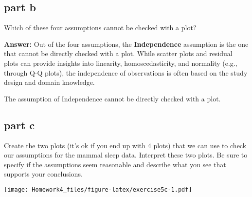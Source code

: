 \documentclass[
]{article}
\newenvironment{Shaded}{\begin{snugshade}}{\end{snugshade}}
\newcommand{\AttributeTok}[1]{\textcolor[rgb]{0.13,0.29,0.53}{#1}}
\newcommand{\DecValTok}[1]{\textcolor[rgb]{0.00,0.00,0.81}{#1}}
\newcommand{\FunctionTok}[1]{\textcolor[rgb]{0.13,0.29,0.53}{\textbf{#1}}}
\newcommand{\NormalTok}[1]{#1}
\newcommand{\SpecialCharTok}[1]{\textcolor[rgb]{0.81,0.36,0.00}{\textbf{#1}}}
\newcommand{\StringTok}[1]{\textcolor[rgb]{0.31,0.60,0.02}{#1}}
\begin{document}
\subsection{part b}\label{part-b-3}

Which of these four assumptions cannot be checked with a plot?

\textbf{Answer:} Out of the four assumptions, the \textbf{Independence}
assumption is the one that cannot be directly checked with a plot. While
scatter plots and residual plots can provide insights into linearity,
homoscedasticity, and normality (e.g., through Q-Q plots), the
independence of observations is often based on the study design and
domain knowledge.

The assumption of Independence cannot be directly checked with a plot.

\subsection{part c}\label{part-c-3}

Create the two plots (it's ok if you end up with 4 plots) that we can
use to check our assumptions for the mammal sleep data. Interpret these
two plots. Be sure to specify if the assumptions seem reasonable and
describe what you see that supports your conclusions.

\begin{Shaded}
\end{Shaded}

\texttt{[image: Homework4\_files/figure-latex/exercise5c-1.pdf]}
\end{document}
